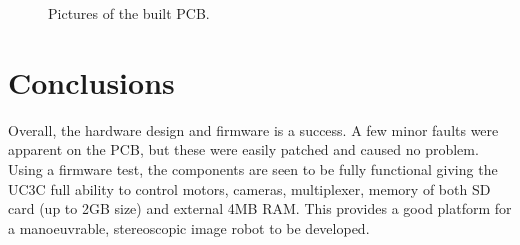 \begin{figure}
\centering
{}
\caption{Pictures of the built PCB.}
\label{fig:PCB:Built}
\end{figure}
\section{Conclusions}

Overall, the hardware design and firmware is a success. A few minor faults were apparent on the PCB, but these were easily patched and caused no problem. Using a firmware test, the components are seen to be fully functional giving the UC3C full ability to control motors, cameras, \itc multiplexer, memory of both SD card (up to 2GB size) and external 4MB RAM. This provides a good platform for a manoeuvrable, stereoscopic image robot to be developed. 